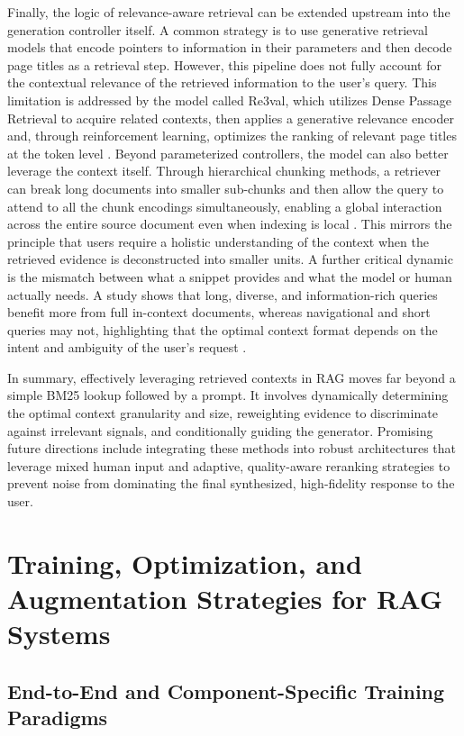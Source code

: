 \documentclass[11pt]{article}
\begin{document}
Finally, the logic of relevance-aware retrieval can be extended upstream into the generation controller itself. A common strategy is to use generative retrieval models that encode pointers to information in their parameters and then decode page titles as a retrieval step. However, this pipeline does not fully account for the contextual relevance of the retrieved information to the user's query. This limitation is addressed by the model called Re3val, which utilizes Dense Passage Retrieval to acquire related contexts, then applies a generative relevance encoder and, through reinforcement learning, optimizes the ranking of relevant page titles at the token level \cite{ref71}. Beyond parameterized controllers, the model can also better leverage the context itself. Through hierarchical chunking methods, a retriever can break long documents into smaller sub-chunks and then allow the query to attend to all the chunk encodings simultaneously, enabling a global interaction across the entire source document even when indexing is local \cite{ref65}. This mirrors the principle that users require a holistic understanding of the context when the retrieved evidence is deconstructed into smaller units. A further critical dynamic is the mismatch between what a snippet provides and what the model or human actually needs. A study shows that long, diverse, and information-rich queries benefit more from full in-context documents, whereas navigational and short queries may not, highlighting that the optimal context format depends on the intent and ambiguity of the user's request \cite{ref72}.

In summary, effectively leveraging retrieved contexts in RAG moves far beyond a simple BM25 lookup followed by a prompt. It involves dynamically determining the optimal context granularity and size, reweighting evidence to discriminate against irrelevant signals, and conditionally guiding the generator. Promising future directions include integrating these methods into robust architectures that leverage mixed human input and adaptive, quality-aware reranking strategies to prevent noise from dominating the final synthesized, high-fidelity response to the user.

\section{Training, Optimization, and Augmentation Strategies for RAG Systems}

\subsection{End-to-End and Component-Specific Training Paradigms}
\end{document}
